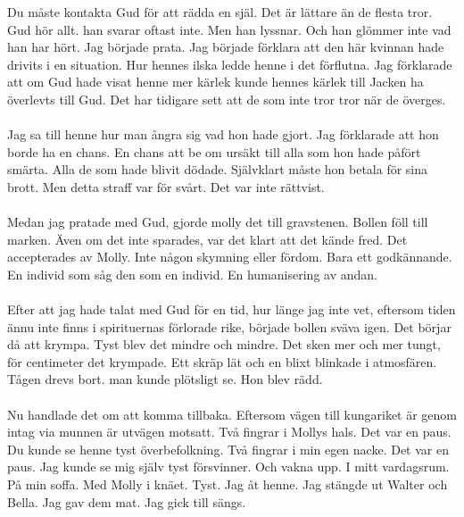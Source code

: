 \documentclass[]{article}
\begin{document}
Du måste kontakta Gud för att rädda en själ. Det är lättare än de flesta tror. Gud hör allt. han svarar oftast inte. Men han lyssnar. Och han glömmer inte vad han har hört. Jag började prata. Jag började förklara att den här kvinnan hade drivits i en situation. Hur hennes ilska ledde henne i det förflutna. Jag förklarade att om Gud hade visat henne mer kärlek kunde hennes kärlek till Jacken ha överlevts till Gud. Det har tidigare sett att de som inte tror tror när de överges.
\\ \\
Jag sa till henne hur man ångra sig vad hon hade gjort. Jag förklarade att hon borde ha en chans. En chans att be om ursäkt till alla som hon hade påfört smärta. Alla de som hade blivit dödade. Självklart måste hon betala för sina brott. Men detta straff var för svårt. Det var inte rättvist. 
\\ \\
Medan jag pratade med Gud, gjorde molly det till gravstenen. Bollen föll till marken. Även om det inte sparades, var det klart att det kände fred. Det accepterades av Molly. Inte någon skymning eller fördom. Bara ett godkännande. En individ som såg den som en individ. En humanisering av andan.
\\ \\
Efter att jag hade talat med Gud för en tid, hur länge jag inte vet, eftersom tiden ännu inte finns i spirituernas förlorade rike, började bollen sväva igen. Det börjar då att krympa. Tyst blev det mindre och mindre. Det sken mer och mer tungt, för centimeter det krympade. Ett skräp lät och en blixt blinkade i atmosfären. Tågen drevs bort. man kunde plötsligt se. Hon blev rädd.
\\ \\
Nu handlade det om att komma tillbaka. Eftersom vägen till kungariket är genom intag via munnen är utvägen motsatt. Två fingrar i Mollys hals. Det var en paus. Du kunde se henne tyst överbefolkning. Två fingrar i min egen nacke. Det var en paus. Jag kunde se mig själv tyst försvinner. Och vakna upp. I mitt vardagsrum. På min soffa. Med Molly i knäet. Tyst. Jag åt henne. Jag stängde ut Walter och Bella. Jag gav dem mat. Jag gick till sängs.
\end{document}
